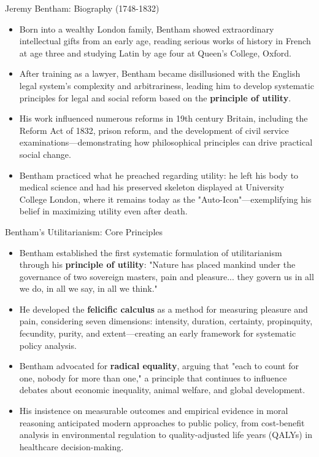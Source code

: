 \documentclass[aspectratio=169]{beamer}
\begin{document}
\begin{frame}{Jeremy Bentham: Biography (1748-1832)}
    \begin{itemize}
        \item Born into a wealthy London family, Bentham showed extraordinary intellectual gifts from an early age, reading serious works of history in French at age three and studying Latin by age four at Queen's College, Oxford.
        
        \item After training as a lawyer, Bentham became disillusioned with the English legal system's complexity and arbitrariness, leading him to develop systematic principles for legal and social reform based on the \textbf{principle of utility}.
        
        \item His work influenced numerous reforms in 19th century Britain, including the Reform Act of 1832, prison reform, and the development of civil service examinations—demonstrating how philosophical principles can drive practical social change.
        
        \item Bentham practiced what he preached regarding utility: he left his body to medical science and had his preserved skeleton displayed at University College London, where it remains today as the "Auto-Icon"—exemplifying his belief in maximizing utility even after death.
    \end{itemize}
\end{frame}

\begin{frame}{Bentham's Utilitarianism: Core Principles}
    \begin{itemize}
        \item Bentham established the first systematic formulation of utilitarianism through his \textbf{principle of utility}: "Nature has placed mankind under the governance of two sovereign masters, pain and pleasure... they govern us in all we do, in all we say, in all we think."
        
        \item He developed the \textbf{felicific calculus} as a method for measuring pleasure and pain, considering seven dimensions: intensity, duration, certainty, propinquity, fecundity, purity, and extent—creating an early framework for systematic policy analysis.
        
        \item Bentham advocated for \textbf{radical equality}, arguing that "each to count for one, nobody for more than one," a principle that continues to influence debates about economic inequality, animal welfare, and global development.
        
        \item His insistence on measurable outcomes and empirical evidence in moral reasoning anticipated modern approaches to public policy, from cost-benefit analysis in environmental regulation to quality-adjusted life years (QALYs) in healthcare decision-making.
        
    \end{itemize}
\end{frame}
\end{document}
